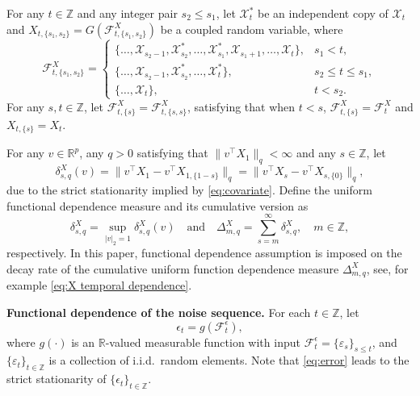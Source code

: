 \documentclass[11pt]{article}
\theoremstyle{plain}
\theoremstyle{definition}
\begin{document}
For any $t \in \mathbb{Z}$ and any integer pair $s_2 \leq s_1$, let $\mathcal{X}_t^*$ be an independent copy of $\mathcal{X}_t$ and $X_{t, \{s_1, s_2\}} = G(\mathcal{F}^X_{t, \{s_1, s_2\}})$ be a coupled random variable, where 
\begin{equation}\label{eq-def-f-couple}
    \mathcal{F}^X_{t, \{s_1, s_2\}} = \begin{cases}
        \{\dots, \mathcal X_{s_2-1}, \mathcal X_ {s_2}^*, \dots, \mathcal X_{s_1}^*,  \mathcal X _{s_1+1}, \dots, \mathcal X_t\}, & s_1 < t, \\
        \{\dots, \mathcal X_{s_2-1}, \mathcal X_ {s_2}^*, \dots, \mathcal X_t^*\}, & s_2 \leq t \leq s_1, \\
        \{\dots, \mathcal X_t\}, & t < s_2.
    \end{cases}
\end{equation}
For any $s, t \in \mathbb{Z}$, let $\mathcal{F}^X_{t, \{s\}} = \mathcal{F}^X_{t, \{s, s\}}$, satisfying that when $t < s$, $\mathcal{F}^X_{t, \{s\}} = \mathcal{F}^X_t$ and $X_{t, \{s\}} = X_t$.

For any $v\in \mathbb R^p$, any $q > 0$ satisfying that $\|v^\top  X_1\|_q < \infty$ and any $s \in \mathbb{Z}$, let
\begin{equation}\label{eq-functional-dependence-x-def-1}
    \delta_{s, q}^X(v) = \|v^\top X_1 - v^\top X_{1, \{1-s\}}\|_q = \|v^\top X_s - v^\top X _{s, \{0\}}\|_q,
\end{equation}
due to the strict stationarity implied by \eqref{eq:covariate}.  Define the uniform functional dependence measure and its cumulative version as
\begin{equation}\label{eq-functional-dependence-x-def-2}
    \delta_{s, q}^X = \sup_{|v|_2=1} \delta_{s, q}^X (v) \quad \text{and} \quad \Delta_{m, q}^X = \sum_{s = m}^{\infty}\delta ^X _{s, q}, \quad m \in \mathbb{Z},
\end{equation}
respectively. In this paper, functional dependence assumption is imposed on the decay rate of the cumulative uniform function dependence measure $\Delta_{m, q}^X$, see, for example \eqref{eq:X temporal dependence}.

\medskip
\noindent \textbf{Functional dependence of the noise sequence.}  For each $t \in \mathbb{Z}$, let
\begin{equation}\label{eq:error}
    \epsilon_t = g(\mathcal F_t^\epsilon),
\end{equation}
where $g(\cdot)$ is an $\mathbb{R}$-valued measurable function with input $\mathcal F_t^\epsilon = \{\varepsilon_s\}_{s \leq t}$, and $\{\varepsilon_t\}_{t \in \mathbb{Z}}$ is a collection of i.i.d.\ random elements.  Note that \eqref{eq:error} leads to the strict stationarity of $\{\epsilon_t\}_{t \in \mathbb{Z}}$.  
\end{document}

